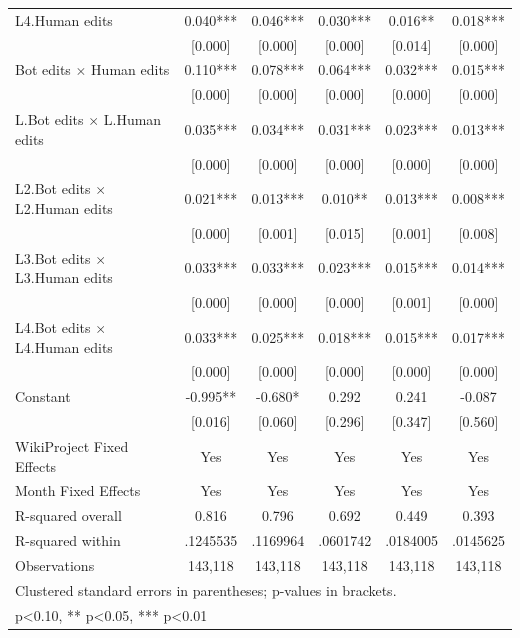 {\begin{tabular}{l*{5}{c}}
L4.Human edits      &     0.040***&     0.046***&     0.030***&     0.016** &     0.018***\\
                    &   [0.000]   &   [0.000]   &   [0.000]   &   [0.014]   &   [0.000]   \\
Bot edits $\times$ Human edits&     0.110***&     0.078***&     0.064***&     0.032***&     0.015***\\
                    &   [0.000]   &   [0.000]   &   [0.000]   &   [0.000]   &   [0.000]   \\
L.Bot edits $\times$ L.Human edits&     0.035***&     0.034***&     0.031***&     0.023***&     0.013***\\
                    &   [0.000]   &   [0.000]   &   [0.000]   &   [0.000]   &   [0.000]   \\
L2.Bot edits $\times$ L2.Human edits&     0.021***&     0.013***&     0.010** &     0.013***&     0.008***\\
                    &   [0.000]   &   [0.001]   &   [0.015]   &   [0.001]   &   [0.008]   \\
L3.Bot edits $\times$ L3.Human edits&     0.033***&     0.033***&     0.023***&     0.015***&     0.014***\\
                    &   [0.000]   &   [0.000]   &   [0.000]   &   [0.001]   &   [0.000]   \\
L4.Bot edits $\times$ L4.Human edits&     0.033***&     0.025***&     0.018***&     0.015***&     0.017***\\
                    &   [0.000]   &   [0.000]   &   [0.000]   &   [0.000]   &   [0.000]   \\
Constant            &    -0.995** &    -0.680*  &     0.292   &     0.241   &    -0.087   \\
                    &   [0.016]   &   [0.060]   &   [0.296]   &   [0.347]   &   [0.560]   \\
WikiProject Fixed Effects&       Yes   &       Yes   &       Yes   &       Yes   &       Yes   \\
Month Fixed Effects &       Yes   &       Yes   &       Yes   &       Yes   &       Yes   \\
\midrule
R-squared overall   &     0.816   &     0.796   &     0.692   &     0.449   &     0.393   \\
R-squared within    &  .1245535   &  .1169964   &  .0601742   &  .0184005   &  .0145625   \\
Observations        &   143,118   &   143,118   &   143,118   &   143,118   &   143,118   \\
\bottomrule
\multicolumn{6}{l}{\footnotesize Clustered standard errors in parentheses; p-values in brackets.}\\
\multicolumn{6}{l}{\footnotesize * p<0.10, ** p<0.05, *** p<0.01}\\
\end{tabular}
}
